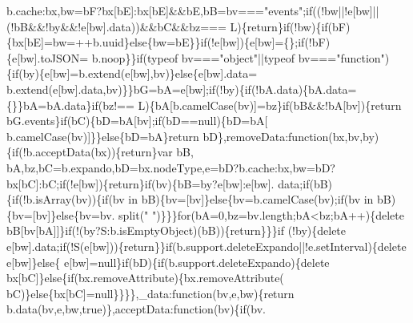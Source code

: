 \begin{DoxyCode}
      b.cache:bx,bw=bF?bx[bE]:bx[bE]&&bE,bB=bv===\textcolor{stringliteral}{"events"};\textcolor{keywordflow}{if}((!bw||!e[bw]||(!bB&&!by&&!e[bw].data))&&bC&&bz===
      L)\{\textcolor{keywordflow}{return}\}\textcolor{keywordflow}{if}(!bw)\{\textcolor{keywordflow}{if}(bF)\{bx[bE]=bw=++b.uuid\}\textcolor{keywordflow}{else}\{bw=bE\}\}\textcolor{keywordflow}{if}(!e[bw])\{e[bw]=\{\};\textcolor{keywordflow}{if}(!bF)\{e[bw].toJSON=
      b.noop\}\}\textcolor{keywordflow}{if}(typeof bv===\textcolor{stringliteral}{"object"}||typeof bv===\textcolor{stringliteral}{"function"})\{\textcolor{keywordflow}{if}(by)\{e[bw]=b.extend(e[bw],bv)\}\textcolor{keywordflow}{else}\{e[bw].data=
      b.extend(e[bw].data,bv)\}\}bG=bA=e[bw];\textcolor{keywordflow}{if}(!by)\{\textcolor{keywordflow}{if}(!bA.data)\{bA.data=\{\}\}bA=bA.data\}\textcolor{keywordflow}{if}(bz!==
      L)\{bA[b.camelCase(bv)]=bz\}\textcolor{keywordflow}{if}(bB&&!bA[bv])\{\textcolor{keywordflow}{return} bG.events\}\textcolor{keywordflow}{if}(bC)\{bD=bA[bv];\textcolor{keywordflow}{if}(bD==null)\{bD=bA[
      b.camelCase(bv)]\}\}\textcolor{keywordflow}{else}\{bD=bA\}\textcolor{keywordflow}{return} bD\},removeData:\textcolor{keyword}{function}(bx,bv,by)\{\textcolor{keywordflow}{if}(!b.acceptData(bx))\{\textcolor{keywordflow}{return}\}var bB,
      bA,bz,bC=b.expando,bD=bx.nodeType,e=bD?b.cache:bx,bw=bD?bx[bC]:bC;\textcolor{keywordflow}{if}(!e[bw])\{\textcolor{keywordflow}{return}\}\textcolor{keywordflow}{if}(bv)\{bB=by?e[bw]:e[bw].
      data;\textcolor{keywordflow}{if}(bB)\{\textcolor{keywordflow}{if}(!b.isArray(bv))\{\textcolor{keywordflow}{if}(bv in bB)\{bv=[bv]\}\textcolor{keywordflow}{else}\{bv=b.camelCase(bv);\textcolor{keywordflow}{if}(bv in bB)\{bv=[bv]\}\textcolor{keywordflow}{else}\{bv=bv.
      split(\textcolor{stringliteral}{" "})\}\}\}\textcolor{keywordflow}{for}(bA=0,bz=bv.length;bA<bz;bA++)\{\textcolor{keyword}{delete} bB[bv[bA]]\}\textcolor{keywordflow}{if}(!(by?S:b.isEmptyObject)(bB))\{\textcolor{keywordflow}{return}\}\}\}\textcolor{keywordflow}{if}
      (!by)\{\textcolor{keyword}{delete} e[bw].data;\textcolor{keywordflow}{if}(!S(e[bw]))\{\textcolor{keywordflow}{return}\}\}\textcolor{keywordflow}{if}(b.support.deleteExpando||!e.setInterval)\{\textcolor{keyword}{delete} e[bw]\}\textcolor{keywordflow}{else}\{
      e[bw]=null\}\textcolor{keywordflow}{if}(bD)\{\textcolor{keywordflow}{if}(b.support.deleteExpando)\{\textcolor{keyword}{delete} bx[bC]\}\textcolor{keywordflow}{else}\{\textcolor{keywordflow}{if}(bx.removeAttribute)\{bx.removeAttribute(
      bC)\}\textcolor{keywordflow}{else}\{bx[bC]=null\}\}\}\},\_data:\textcolor{keyword}{function}(bv,e,bw)\{\textcolor{keywordflow}{return} b.data(bv,e,bw,\textcolor{keyword}{true})\},acceptData:\textcolor{keyword}{function}(bv)\{\textcolor{keywordflow}{if}(bv.

\end{DoxyCode}
